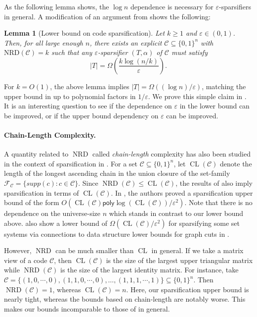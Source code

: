 \documentclass{article}
\newtheorem{lemma}[lemma]{Lemma}
\DeclareMathOperator{\NRD}{NRD}
\DeclareMathOperator{\CL}{CL}
\renewcommand{\epsilon}{\varepsilon}
\newcommand{\poly}{\mathsf{poly}}
\newcommand{\<}{\langle}
\renewcommand{\>}{\rangle}
\newcommand{\calC}{\mathcal{C}}
\begin{document}
As the following lemma shows, the $\log n$ dependence is necessary for $\varepsilon$-sparsifiers in general. A modification of an argument from \cite{BG25} shows the following:

\begin{lemma}[Lower bound on code sparsification]\label{main:sparsification_lower_bound}
Let $k \ge 1$ and $\varepsilon \in (0,1)$. Then, for all large enough $n$, there exists an explicit $\calC \subseteq \{0, 1\}^n$ with $\mathrm{NRD}(\calC)= k$ such that any $\varepsilon$-sparsifier $(T, \alpha)$ of $\calC$ must satisfy
    \[
    |T| =\Omega \left( \frac{k \log (n/k)}{\varepsilon} \right).
    \]
\end{lemma}
For $k = O(1)$, the above lemma implies $|T| = \Omega ((\log n) / \varepsilon)$, matching the upper bound in  up to polynomial factors in $1/\varepsilon$. We prove this simple claim in . It is an interesting question to see if the dependence on $\varepsilon$ in the lower bound can be improved, or if the upper bound dependency on $\varepsilon$ can be improved.

\paragraph{Chain-Length Complexity.} A quantity related to $\NRD$ called \emph{chain-length} complexity has also been studied in the context of sparsification in \cite{brakensiek2026multiplicative}. For a set $\mathcal{C} \subseteq \{0,1\}^n$, let $\CL(\calC)$ denote the length of the longest ascending chain in the union closure of the set-family $\mathcal{F}_{\calC} = \{supp(c): c \in \calC\}$. Since $\NRD(\calC) \leq \CL(\calC)$, the results of \cite{BG25} also imply sparsification in terms of $\CL(\calC)$. In \cite{brakensiek2026multiplicative}, the authors proved a sparsification upper bound of the form $O(\CL(\calC) \poly\log(\CL(\calC))/\epsilon^2)$. Note that there is no dependence on the universe-size $n$ which stands in contrast to our lower bound above. \cite{brakensiek2026multiplicative} also show a lower bound  of $\Omega(\CL(\calC)/\epsilon^2)$ for sparsifying some set systems via connections to data structure lower bounds for graph cuts in \cite{carlson2019optimal}.  

However, $\NRD$ can be much smaller than $\CL$ in general. If we take a matrix view of a code $\calC$, then $\CL (\calC)$ is the size of the largest upper triangular matrix while $\NRD(\calC)$ is the size of the largest identity matrix. For instance, take $\calC = \{(1,0,\cdots, 0), (1,1,0,\cdots,0),\ldots,(1,1,1,\cdots,1)\} \subseteq \{0,1\}^n$. Then $\NRD(\calC) = 1$, whereas $\CL(\calC) = n$. Here, our sparsification upper bound is nearly tight, whereas the bounds based on chain-length are notably worse. This makes our bounds incomparable to those of \cite{ brakensiek2026multiplicative} in general.
\end{document}
